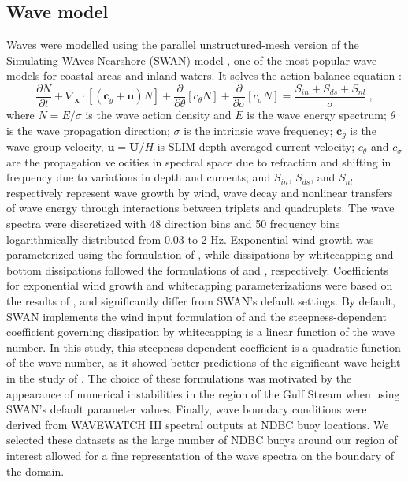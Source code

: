 \documentclass[preprint,12pt,authoryear]{elsarticle}
\begin{document}
\subsection{Wave model}
Waves were modelled using the parallel unstructured-mesh version of the Simulating WAves Nearshore (SWAN) model \citep{booij1999third}, one of the most popular wave models for coastal areas and inland waters. It solves the action balance equation \citep{mei1989applied}:
\begin{equation}
    \dfrac{\partial N}{\partial t} + \nabla_\mathbf{x}\cdot[(\mathbf{c}_g+\mathbf{u})N] + \dfrac{\partial }{\partial \theta}[c_\theta N] + \dfrac{\partial}{\partial \sigma}[c_\sigma N] = \dfrac{S_{in}+S_{ds}+S_{nl}}{\sigma}~, \label{eq:swan}
\end{equation}
where $N=E/\sigma$ is the wave action density and $E$ is the wave energy spectrum; $\theta$ is the wave propagation direction; $\sigma$ is the intrinsic wave frequency; $\mathbf{c}_g$ is the wave group velocity, $\mathbf{u}=\mathbf{U}/H$ is SLIM depth-averaged current velocity; $c_\theta$ and $c_\sigma$ are the propagation velocities in spectral space due to refraction and shifting in frequency due to variations in depth and currents; and $S_{in}$, $S_{ds}$, and $S_{nl}$ respectively represent wave growth by wind, wave decay and nonlinear transfers of wave energy through interactions between triplets and quadruplets. The wave spectra were discretized with 48 direction bins and 50 frequency bins logarithmically distributed from 0.03 to 2 Hz. Exponential wind growth was parameterized using the formulation of \cite{janssen1991quasi}, while dissipations by whitecapping and bottom dissipations followed the formulations of \cite{komen1984existence} and \cite{madsen1989spectral}, respectively. Coefficients for exponential wind growth and whitecapping parameterizations were based on the results of \cite{siadatmousavi2011evaluation}, and significantly differ from SWAN's default settings. By default, SWAN implements the wind input formulation of \cite{komen1984existence} and the steepness-dependent coefficient governing dissipation by whitecapping is a linear function of the wave number. In this study, this steepness-dependent coefficient is a quadratic function of the wave number, as it showed better predictions of the significant wave height in the study of \cite{siadatmousavi2011evaluation}. The choice of these formulations was motivated by the appearance of numerical instabilities in the region of the Gulf Stream when using SWAN's default parameter values. Finally, wave boundary conditions were derived from WAVEWATCH III \citep{tolman2009user} spectral outputs at NDBC buoy locations. We selected these datasets as the large number of NDBC buoys around our region of interest allowed for a fine representation of the wave spectra on the boundary of the domain. 
\end{document}
